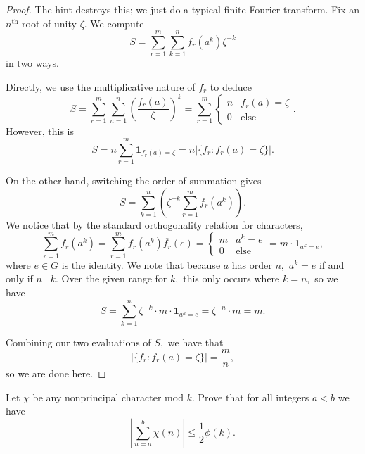 \begin{proof}
The hint destroys this; we just do a typical finite Fourier transform. Fix an $n^\text{th}$ root of unity $\zeta.$ We compute
\[S=\sum_{r=1}^m\sum_{k=1}^nf_r\left(a^k\right)\zeta^{-k}\]
in two ways.

Directly, we use the multiplicative nature of $f_r$ to deduce
\[S=\sum_{r=1}^m\sum_{n=1}^n\left(\frac{f_r(a)}{\zeta}\right)^k=\sum_{r=1}^m\begin{cases}n & f_r(a)=\zeta\\0&\text{else}\end{cases}.\]
However, this is
\[S=n\sum_{r=1}^m{\mathbf1}_{f_r(a)=\zeta}=n|\{f_r:f_r(a)=\zeta\}|.\]

On the other hand, switching the order of summation gives
\[S=\sum_{k=1}^n\left(\zeta^{-k}\sum_{r=1}^mf_r\left(a^k\right)\right).\]
We notice that by the standard orthogonality relation for characters,
\[\sum_{r=1}^mf_r\left(a^k\right)=\sum_{r=1}^mf_r\left(a^k\right)\overline{f_r}(e)=\begin{cases}m & a^k=e \\ 0 & \text{else}\end{cases}=m\cdot\mathbf1_{a^k=e},\]
where $e\in G$ is the identity. We note that because $a$ has order $n,$ $a^k=e$ if and only if $n\mid k.$ Over the given range for $k,$ this only occurs where $k=n,$ so we have
\[S=\sum_{k=1}^n\zeta^{-k}\cdot m\cdot\mathbf1_{a^k=e}=\zeta^{-n}\cdot m=m.\]

Combining our two evaluations of $S,$ we have that
\[|\{f_r:f_r(a)=\zeta\}|=\frac mn,\]
so we are done here.
\end{proof}

\begin{exercise}[15]
Let $\chi$ be any nonprincipal character mod $k.$ Prove that for all integers $a<b$ we have
\[\left|\sum_{n=a}^b\chi(n)\right|\le\frac12\phi(k).\]
\end{exercise}

